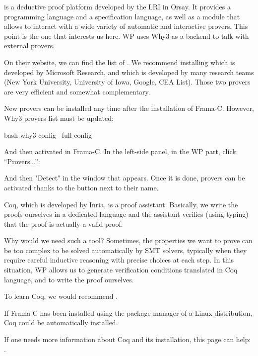 

 is a deductive proof platform
developed by the LRI in Orsay. It
provides a programming language and a specification language, as well as
a module that allows to interact with a wide variety of automatic and
interactive provers. This point is the one that interests us here. WP uses
Why3 as a backend to talk with external provers.


On their website, we can find the list of
.
We recommend installing
 which is
developed by Microsoft Research, and
 which is developed by many
research teams (New York University, University of Iowa, Google, CEA
List). Those two provers are very efficient and somewhat complementary.


New provers can be installed any time after the installation of Frama-C.
However, Why3 provers list must be updated:

\begin{CodeBlock}{bash}
why3 config --full-config
\end{CodeBlock}

And then activated in Frama-C. In the left-side panel, in the WP part,
click ``Provers...'':




And then "Detect" in the window that appears. Once it is done, provers
can be activated thanks to the button next to their name.






Coq, which is developed by Inria, is a proof assistant. Basically, we
write the proofs ourselves in a dedicated language and the assistant
verifies (using typing) that the proof is actually a valid proof.



Why would we need such a tool? Sometimes, the properties we want to
prove can be too complex to be solved automatically by SMT solvers,
typically when they require careful inductive reasoning with precise
choices at each step. In this situation, WP allows us to generate
verification conditions translated in Coq language, and to write the
proof ourselves.




To learn Coq, we would recommend
.



\begin{Information}
  If Frama-C has been installed using the package manager of a Linux
  distribution, Coq could be automatically installed.
\end{Information}


If one needs more information about Coq and its installation, this page
can help: .

